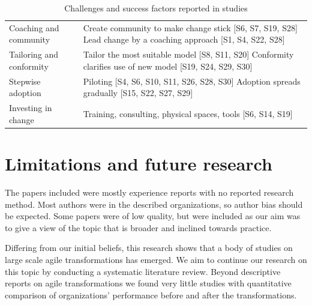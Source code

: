 \documentclass[lnbip]{svmultln}
\begin{document}
\begin{table}[t]
\begin{tabular}{ p{} p{} }
        \raggedright\rule{0pt}{0.4cm}Coaching and community  &
             Create community to make change stick [S6, S7, S19, S28] \newline
             Lead change by a coaching approach [S1, S4, S22, S28] \\
        
        \raggedright\rule{0pt}{0.4cm}Tailoring and conformity  &
            Tailor the most suitable model [S8, S11, S20] \newline
            Conformity clarifies use of new model [S19, S24, S29, S30]\\
        
        \raggedright\rule{0pt}{0.4cm}Stepwise adoption  &
            Piloting [S4, S6, S10, S11, S26, S28, S30]\newline
            Adoption spreads gradually [S15, S22, S27, S29]\\
        
        \raggedright\rule{0pt}{0.4cm}Investing in change  &
            Training, consulting, physical spaces, tools [S6, S14, S19]\\
        \bottomrule
    \end{tabular}
    \caption{Challenges and success factors reported in studies}
    \label{table:success}
\end{table}


\section{Limitations and future research}
\label{sec:conclusion}

The papers included were mostly experience reports with no reported research
method. Most authors were in the described organizations, so author bias should
be expected. Some papers were of low quality, but were included as our aim was
to give a view of the topic that is broader and inclined towards practice.

Differing from our initial beliefs, this research shows that a body of studies
on large scale agile transformations has emerged. We aim to continue our
research on this topic by conducting a systematic literature review. Beyond
descriptive reports on agile transformations we found very little studies with
quantitative comparison of organizations' performance before and after the
transformations.



\end{document}
